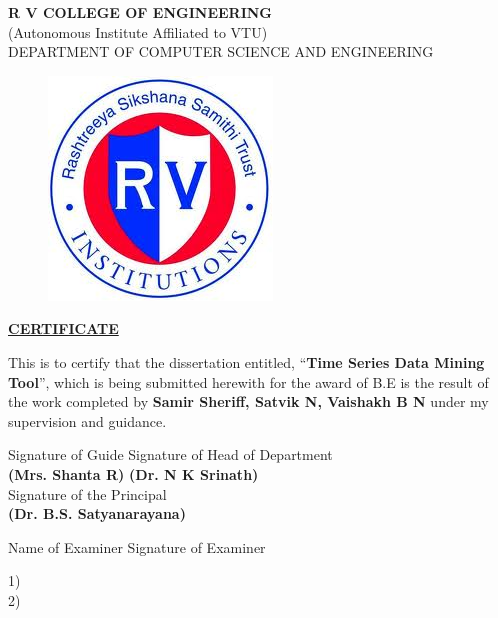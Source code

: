 \documentclass[12pt,a4paper]{report}
\begin{document}
\begin{titlepage}
\newpage
\begin{center}
{\bfseries\large R V COLLEGE OF ENGINEERING}\\
{\normalsize (Autonomous Institute Affiliated to VTU)}\\
{\normalsize DEPARTMENT OF COMPUTER SCIENCE AND ENGINEERING}\\
\end{center}
	
\begin{figure}[h!]
	\centering
		\includegraphics[scale=0.5]{RVCE.png}
\end{figure}

\begin{center}
\bf{\underline{CERTIFICATE}}
\end{center}
\noindent This is to certify that the dissertation entitled, ``\textbf{Time Series Data Mining Tool}'',  which is being submitted herewith for the award of B.E is the result of the work completed by \textbf{Samir Sheriff, Satvik N, Vaishakh B N}  under my supervision and guidance.
\vspace{.5in}

\begin{flushleft} 
\vspace{.5in}
Signature of Guide 	
\hspace{4cm}
 Signature of Head of Department  \\
\textbf{(Mrs. Shanta R)}  \hspace{6cm}\textbf{(Dr. N K Srinath)} \\
\vspace{.5in}
\hspace{4cm} Signature of the Principal  \\
\hspace{4cm} \textbf{(Dr. B.S. Satyanarayana)}

 \end{flushleft} 
\begin{flushleft}
\hspace{1in}Name of Examiner \hspace{1.25in} Signature of Examiner
\end{flushleft}
\begin{flushleft}
1)\\
\vspace{.5in} 
2)
\end{flushleft}
\end{titlepage}
\end{document}
